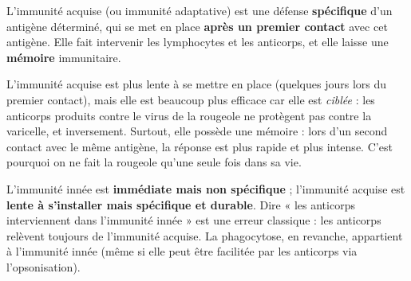 \documentclass[11pt]{article}
\newcommand{\cle}[1]{{\popxbold\color{popdark}#1}}
\begin{document}
\begin{definition}
L'\cle{immunité acquise} (ou immunité adaptative) est une défense \textbf{spécifique} d'un antigène déterminé, qui se met en place \textbf{après un premier contact} avec cet antigène. Elle fait intervenir les lymphocytes et les anticorps, et elle laisse une \textbf{mémoire} immunitaire.
\end{definition}

L'immunité acquise est plus lente à se mettre en place (quelques jours lors du premier contact), mais elle est beaucoup plus efficace car elle est \emph{ciblée} : les anticorps produits contre le virus de la rougeole ne protègent pas contre la varicelle, et inversement. Surtout, elle possède une \cle{mémoire} : lors d'un second contact avec le même antigène, la réponse est plus rapide et plus intense. C'est pourquoi on ne fait la rougeole qu'une seule fois dans sa vie.

\begin{attention}
L'immunité innée est \textbf{immédiate mais non spécifique} ; l'immunité acquise est \textbf{lente à s'installer mais spécifique et durable}. Dire « les anticorps interviennent dans l'immunité innée » est une erreur classique : les anticorps relèvent toujours de l'immunité acquise. La phagocytose, en revanche, appartient à l'immunité innée (même si elle peut être facilitée par les anticorps via l'opsonisation).
\end{attention}
\end{document}
